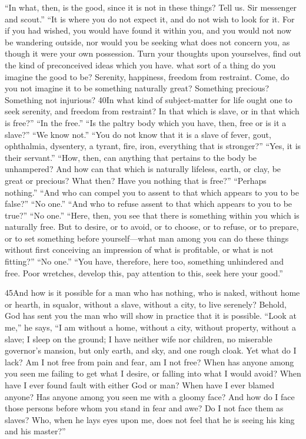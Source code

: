 ``In what, then, is the good, since it is not in these things? Tell us. Sir messenger and scout.'' ``It is where you do not expect it, and do not wish to look for it. For if you had wished, you would have found it within you, and you would not now be wandering outside, nor would you be seeking what does not concern you, as though it were your own possession. Turn your thoughts upon yourselves, find out the kind of preconceived ideas which you have. what sort of a thing do you imagine the good to be? Serenity, happiness, freedom from restraint. Come, do you not imagine it to be something naturally great? Something precious? Something not injurious? 40In what kind of subject-matter for life ought one to seek serenity, and freedom from restraint? In that which is slave, or in that which is free?'' ``In the free.'' ``Is the paltry body which you have, then, free or is it a slave?'' ``We know not.'' ``You do not know that it is a slave of fever, gout, ophthalmia, dysentery, a tyrant, fire, iron, everything that is stronger?'' ``Yes, it is their servant.'' ``How, then, can anything that pertains to the body be unhampered? And how can that which is naturally lifeless, earth, or clay, be great or precious? What then? Have you nothing that is free?'' ``Perhaps nothing.'' ``And who can compel you to assent to that which appears to you to be false?'' ``No one.'' ``And who to refuse assent to that which appears to you to be true?'' ``No one.'' ``Here, then, you see that there is something within you which is naturally free. But to desire, or to avoid, or to choose, or to refuse, or to prepare, or to set something before yourself—what man among you can do these things without first conceiving an impression of what is profitable, or what is not fitting?'' ``No one.'' ``You have, therefore, here too, something unhindered and free. Poor wretches, develop this, pay attention to this, seek here your good.''

45And how is it possible for a man who has nothing, who is naked, without home or hearth, in squalor, without a slave, without a city, to live serenely? Behold, God has sent you the man who will show in practice that it is possible. ``Look at me,'' he says, ``I am without a home, without a city, without property, without a slave; I sleep on the ground; I have neither wife nor children, no miserable governor's mansion, but only earth, and sky, and one rough cloak. Yet what do I lack? Am I not free from pain and fear, am I not free? When has anyone among you seen me failing to get what I desire, or falling into what I would avoid? When have I ever found fault with either God or man? When have I ever blamed anyone? Has anyone among you seen me with a gloomy face? And how do I face those persons before whom you stand in fear and awe? Do I not face them as slaves? Who, when he lays eyes upon me, does not feel that he is seeing his king and his master?''


